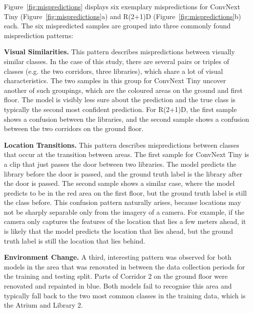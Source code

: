 \documentclass[a4paper]{article}
\begin{document}
Figure~\ref{fig:mispredictions} displays six exemplary mispredictions for
ConvNext Tiny (Figure~\ref{fig:mispredictions}a) and R(2+1)D
(Figure~\ref{fig:mispredictions}b) each. The six mispredicted samples are
grouped into three commonly found misprediction patterns:

\textbf{Visual Similarities.} This pattern describes mispredictions between
visually similar classes. In the case of this study, there are several pairs or
triples of classes (e.g. the two corridors, three libraries), which share a lot
of visual characteristics. The two samples in this group for ConvNext Tiny
uncover another of such groupings, which are the coloured areas on the ground
and first floor. The model is visibly less sure about the prediction and the
true class is typically the second most confident prediction. For R(2+1)D, the
first sample shows a confusion between the libraries, and the second sample
shows a confusion between the two corridors on the ground floor.

\textbf{Location Transitions.} This pattern describes mispredictions between
classes that occur at the transition between areas. The first sample for
ConvNext Tiny is a clip that just passes the door between two libraries. The
model predicts the library before the door is passed, and the ground truth label
is the library after the door is passed. The second sample shows a similar case,
where the model predicts to be in the red area on the first floor, but the
ground truth label is still the class before. This confusion pattern naturally
arises, because locations may not be sharply separable only from the imagery of
a camera. For example, if the camera only captures the features of the location
that lies a few meters ahead, it is likely that the model predicts the location
that lies ahead, but the ground truth label is still the location that lies
behind.

\textbf{Environment Change.} A third, interesting pattern was observed for both
models in the area that was renovated in between the data collection
periods for the training and testing split. Parts of Corridor 2 on the ground
floor were renovated and repainted in blue. Both models fail to recognise this
area and typically fall back to the two most common classes in the training
data, which is the Atrium and Library 2.
\end{document}
